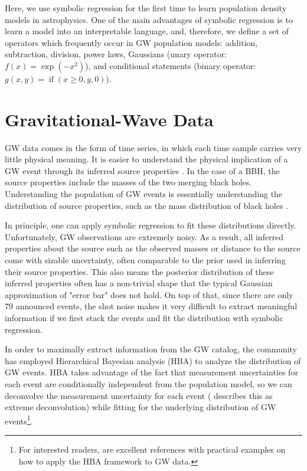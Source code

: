 \documentclass[nohyperref]{article}
\theoremstyle{plain}
\theoremstyle{definition}
\theoremstyle{remark}
\begin{document}
Here, we use symbolic regression for the first time to learn population density models in astrophysics.
One of the main advantages of symbolic regression is to learn a model into an interpretable language, and, therefore, we define a set of operators which frequently occur in GW population models: addition, subtraction, division, power laws, Gaussians (unary operator: $f(x)=\exp(-x^2)$), and conditional statements (binary operator: $g(x, y)=\operatorname{if}(x \geq 0, y, 0)$).


\section{Gravitational-Wave Data}
\label{sec:GWdata}

GW data comes in the form of time series, in which each time sample carries very little physical meaning.
It is easier to understand the physical implication of a GW event through its inferred source properties \cite{Veitch:2014wba}.
In the case of a BBH, the source properties include the masses of the two merging black holes.
Understanding the population of GW events is essentially understanding the distribution of source properties, such as the mass distribution of black holes \cite{2019PASA...36...10T,Vitale:2020aaz}.

In principle, one can apply symbolic regression to fit these distributions directly.
Unfortunately, GW observations are extremely noisy. As a result, all inferred properties about the source such as the observed masses or distance to the source come with sizable uncertainty, often comparable to the prior used in inferring their source properties.
This also means the posterior distribution of these inferred properties often has a non-trivial shape that the typical Gaussian approximation of "error bar" does not hold.
On top of that, since there are only 79 announced events, the shot noise makes it very difficult to extract meaningful information if we first stack the events and fit the distribution with symbolic regression.

In order to maximally extract information from the GW catalog, the community has employed Hierarchical Bayesian analysis (HBA) to analyze the distribution of GW events.
HBA takes advantage of the fact that measurement uncertainties for each event are conditionally independent from the population model, so we can deconvolve the measurement uncertainty for each event (\cite{10.1214/10-AOAS439} describes this as extreme deconvolution) while fitting for the underlying distribution of GW events\footnote{For interested readers, \cite{Mandel:2018mve,Vitale:2020aaz,2019MNRAS.484.4008G} are excellent references with practical examples on how to apply the HBA framework to GW data.
}.
\end{document}
